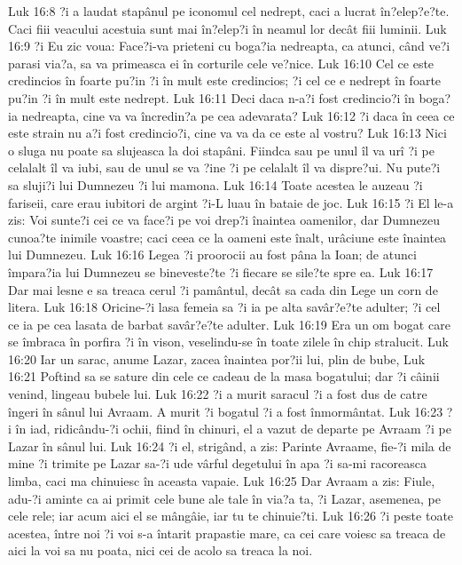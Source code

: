 Luk 16:8  ?i a laudat stapânul pe iconomul cel nedrept, caci a lucrat în?elep?e?te. Caci fiii veacului acestuia sunt mai în?elep?i în neamul lor decât fiii luminii.
Luk 16:9  ?i Eu zic voua: Face?i-va prieteni cu boga?ia nedreapta, ca atunci, când ve?i parasi via?a, sa va primeasca ei în corturile cele ve?nice.
Luk 16:10  Cel ce este credincios în foarte pu?in ?i în mult este credincios; ?i cel ce e nedrept în foarte pu?in ?i în mult este nedrept.
Luk 16:11  Deci daca n-a?i fost credincio?i în boga?ia nedreapta, cine va va încredin?a pe cea adevarata?
Luk 16:12  ?i daca în ceea ce este strain nu a?i fost credincio?i, cine va va da ce este al vostru?
Luk 16:13  Nici o sluga nu poate sa slujeasca la doi stapâni. Fiindca sau pe unul îl va urî ?i pe celalalt îl va iubi, sau de unul se va ?ine ?i pe celalalt îl va dispre?ui. Nu pute?i sa sluji?i lui Dumnezeu ?i lui mamona.
Luk 16:14  Toate acestea le auzeau ?i fariseii, care erau iubitori de argint ?i-L luau în bataie de joc.
Luk 16:15  ?i El le-a zis: Voi sunte?i cei ce va face?i pe voi drep?i înaintea oamenilor, dar Dumnezeu cunoa?te inimile voastre; caci ceea ce la oameni este înalt, urâciune este înaintea lui Dumnezeu.
Luk 16:16  Legea ?i proorocii au fost pâna la Ioan; de atunci împara?ia lui Dumnezeu se bineveste?te ?i fiecare se sile?te spre ea.
Luk 16:17  Dar mai lesne e sa treaca cerul ?i pamântul, decât sa cada din Lege un corn de litera.
Luk 16:18  Oricine-?i lasa femeia sa ?i ia pe alta savâr?e?te adulter; ?i cel ce ia pe cea lasata de barbat savâr?e?te adulter.
Luk 16:19  Era un om bogat care se îmbraca în porfira ?i în vison, veselindu-se în toate zilele în chip stralucit.
Luk 16:20  Iar un sarac, anume Lazar, zacea înaintea por?ii lui, plin de bube,
Luk 16:21  Poftind sa se sature din cele ce cadeau de la masa bogatului; dar ?i câinii venind, lingeau bubele lui.
Luk 16:22  ?i a murit saracul ?i a fost dus de catre îngeri în sânul lui Avraam. A murit ?i bogatul ?i a fost înmormântat.
Luk 16:23  ?i în iad, ridicându-?i ochii, fiind în chinuri, el a vazut de departe pe Avraam ?i pe Lazar în sânul lui.
Luk 16:24  ?i el, strigând, a zis: Parinte Avraame, fie-?i mila de mine ?i trimite pe Lazar sa-?i ude vârful degetului în apa ?i sa-mi racoreasca limba, caci ma chinuiesc în aceasta vapaie.
Luk 16:25  Dar Avraam a zis: Fiule, adu-?i aminte ca ai primit cele bune ale tale în via?a ta, ?i Lazar, asemenea, pe cele rele; iar acum aici el se mângâie, iar tu te chinuie?ti.
Luk 16:26  ?i peste toate acestea, între noi ?i voi s-a întarit prapastie mare, ca cei care voiesc sa treaca de aici la voi sa nu poata, nici cei de acolo sa treaca la noi.
